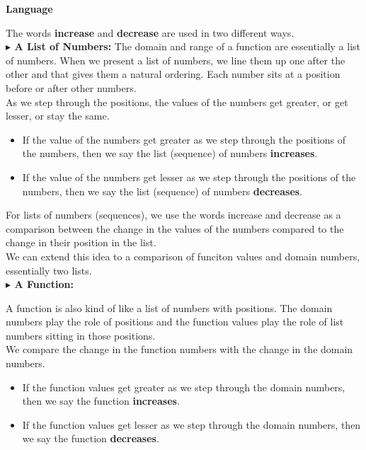 \documentclass{ximera}
\begin{document}
\begin{warning} \textbf{\textcolor{red!70!black}{Language}}

The words \textbf{increase} and \textbf{decrease} are used in two different ways. \\


\textbf{\textcolor{blue!55!black}{$\blacktriangleright$ A List of Numbers:}} The domain and range of a function are essentially a list of numbers. When we present a list of numbers, we line them up one after the other and that gives them a natural ordering.  Each number sits at a position before or after other numbers. \\

As we step through the positions, the values of the numbers get greater, or get lesser, or stay the same. \\ 

\begin{itemize}
    \item If the value of the numbers get greater as we step through the positions of the numbers, then we say the list (sequence) of numbers \textbf{increases}.  
    \item If the value of the numbers get lesser as we step through the positions of the numbers, then we say the list (sequence) of numbers \textbf{decreases}. 
\end{itemize}


For lists of numbers (sequences), we use the words increase and decrease as a comparison between the change in the values of the numbers compared to the change in their position in the list. \\


We can extend this idea to a comparison of funciton values and domain numbers, essentially two lists. \\

\textbf{\textcolor{blue!55!black}{$\blacktriangleright$ A Function:}} 

A function is also kind of like a list of numbers with positions.  The domain numbers play the role of positions and the function values play the role of list numbers sitting in those positions. \\

We compare the change in the function numbers with the change in the domain numbers. \\

\begin{itemize}
    \item If the function values get greater as we step through the domain numbers, then we say the function \textbf{increases}.  
    \item If the function values get lesser as we step through the domain numbers, then we say the function \textbf{decreases}.  
\end{itemize}


\end{warning}
\end{document}
